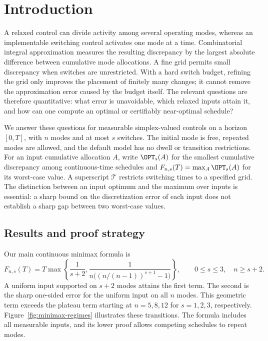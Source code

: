 \section{Introduction}\label{sec:introduction}

A relaxed control can divide activity among several operating modes, whereas
an implementable switching control activates one mode at a time. Combinatorial
integral approximation measures the resulting discrepancy by the largest
absolute difference between cumulative mode allocations. A fine grid permits
small discrepancy when switches are unrestricted. With a hard switch budget,
refining the grid only improves the placement of finitely many changes; it
cannot remove the approximation error caused by the budget itself. The
relevant questions are therefore quantitative: what error is unavoidable,
which relaxed inputs attain it, and how can one compute an optimal or
certifiably near-optimal schedule?

We answer these questions for measurable simplex-valued controls on a horizon
$[0,T]$, with $n$ modes and at most $s$ switches. The initial mode is free,
repeated modes are allowed, and the default model has no dwell or transition
restrictions. For an input cumulative allocation $A$, write $\OPT_s(A)$ for
the smallest cumulative discrepancy among continuous-time schedules and
$F_{n,s}(T)=\max_A\OPT_s(A)$ for its worst-case value. A superscript
$\mathcal T$ restricts switching times to a specified grid. The distinction
between an input optimum and the maximum over inputs is essential: a sharp
bound on the discretization error of each input does not establish a sharp
gap between two worst-case values.

\subsection{Results and proof strategy}

Our main continuous minimax formula is
\begin{equation}\label{eq:intro-main}
 F_{n,s}(T)=T\max\left\{\frac{1}{s+2},
 \frac{1}{n\bigl((n/(n-1))^{s+1}-1\bigr)}\right\},
 \qquad 0\le s\le3,\quad n\ge s+2.
\end{equation}
A uniform input supported on $s+2$ modes attains the first term. The second
is the sharp one-sided error for the uniform input on all $n$ modes. This
geometric term exceeds the plateau term starting at $n=5,8,12$ for
$s=1,2,3$, respectively. Figure~\ref{fig:minimax-regimes} illustrates these
transitions. The formula includes all measurable inputs, and its lower proof
allows competing schedules to repeat modes.

